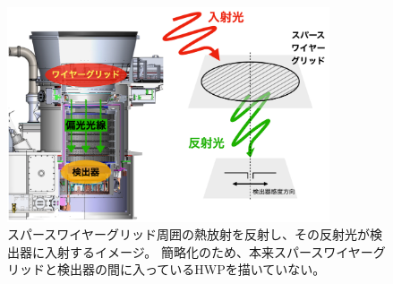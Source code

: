\documentclass[../../main.tex]{subfiles}
\begin{document}
\begin{figure}[H]
    \centering
    \includegraphics[width=0.85\textwidth]{wiregrid/wiregrid_into_telescope.pdf}
    \caption{スパースワイヤーグリッド周囲の熱放射を反射し、その反射光が検出器に入射するイメージ。
    簡略化のため、本来スパースワイヤーグリッドと検出器の間に入っているHWPを描いていない。
    }
    \label{fig:wire_grid_into_telescope}
\end{figure}
\end{document}
